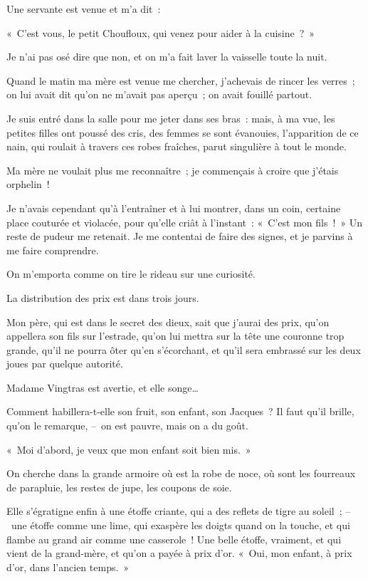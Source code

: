 \documentclass[french,twoside]{book} %
\begin{document}
Une servante est venue et m’a dit :\par
« C’est vous, le petit Choufloux, qui venez pour aider à la cuisine ? »\par
Je n’ai pas osé dire que non, et on m’a fait laver la vaisselle toute la nuit.\par
Quand le matin ma mère est venue me chercher, j’achevais de rincer les verres ; on lui avait dit qu’on ne m’avait pas aperçu ; on avait fouillé partout.\par
Je suis entré dans la salle pour me jeter dans ses bras : mais, à ma vue, les petites filles ont poussé des cris, des femmes se sont évanouies, l’apparition de ce nain, qui roulait à travers ces robes fraîches, parut singulière à tout le monde.\par
Ma mère ne voulait plus me reconnaître ; je commençais à croire que j’étais orphelin !\par
Je n’avais cependant qu’à l’entraîner et à lui montrer, dans un coin, certaine place couturée et violacée, pour qu’elle criât à l’instant : « C’est mon fils ! » Un reste de pudeur me retenait. Je me contentai de faire des signes, et je parvins à me faire comprendre.\par
On m’emporta comme on tire le rideau sur une curiosité.\par
\bigbreak
\noindent La distribution des prix est dans trois jours.\par
Mon père, qui est dans le secret des dieux, sait que j’aurai des prix, qu’on appellera son fils sur l’estrade, qu’on lui mettra sur la tête une couronne trop grande, qu’il ne pourra ôter qu’en s’écorchant, et qu’il sera embrassé sur les deux joues par quelque autorité.\par
Madame Vingtras est avertie, et elle songe…\par
Comment habillera-t-elle son fruit, son enfant, son Jacques ? Il faut qu’il brille, qu’on le remarque, – on est pauvre, mais on a du goût.\par
« Moi d’abord, je veux que mon enfant soit bien mis. »\par
On cherche dans la grande armoire où est la robe de noce, où sont les fourreaux de parapluie, les restes de jupe, les coupons de soie.\par
Elle s’égratigne enfin à une étoffe criante, qui a des reflets de tigre au soleil ; – une étoffe comme une lime, qui exaspère les doigts quand on la touche, et qui flambe au grand air comme une casserole ! Une belle étoffe, vraiment, et qui vient de la grand-mère, et qu’on a payée à prix d’or. « Oui, mon enfant, à prix d’or, dans l’ancien temps. »\par
\end{document}
